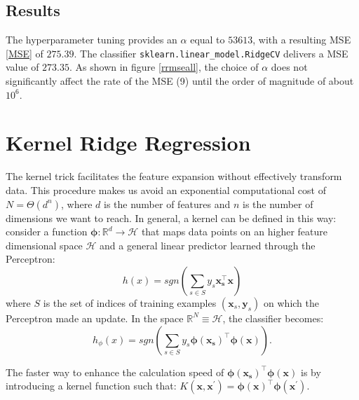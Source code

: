 \documentclass{article}
\begin{document}
\subsection{Results}
The hyperparameter tuning provides an $\alpha$ equal to $53613$, with a resulting MSE \eqref{MSE} of $275.39$. The classifier \texttt{sklearn.linear\_model.RidgeCV} delivers a MSE value of $273.35$. As shown in figure \ref{rrmseall}, the choice of $\alpha$ does not significantly affect the rate of the MSE (9) until the order of magnitude of about $10^6$.

\section{Kernel Ridge Regression}
The kernel trick facilitates the feature expansion without effectively transform data. This procedure makes us avoid an exponential computational cost of $N = \Theta(d^n)$, where $d$ is the number of features and $n$ is the number of dimensions we want to reach. In general, a kernel can be defined in this way: consider a function $\boldsymbol{\phi}: \mathbb{R}^d \rightarrow \mathcal{H}$ that maps data points on an higher feature dimensional space $\mathcal{H}$ and a general linear predictor learned through the Perceptron: \begin{equation}
h(x) = sgn\left(\sum_{s \in S}y_s\boldsymbol{x_s^\top}\boldsymbol{x}\right)
\end{equation} where $S$ is the set of indices of training examples $(\boldsymbol{x}_s,\boldsymbol{y}_s)$ on which the Perceptron made an update. In the space $\mathbb{R}^N \equiv \mathcal{H}$, the classifier becomes: \begin{equation}
h{_\phi}(x) = sgn\left(\sum_{s \in S}y_s\boldsymbol{\phi(x_s)^\top}\boldsymbol{\phi(x)}\right).
\end{equation}
    
    
The faster way to enhance the calculation speed of $\boldsymbol{\phi(x_s)^\top}\boldsymbol{\phi(x)}$ is by introducing a kernel function such that: $K(\boldsymbol{x},\boldsymbol{x^\prime}) = \boldsymbol{\phi(x)^\top}\boldsymbol{\phi(x^\prime)}.$
\end{document}
